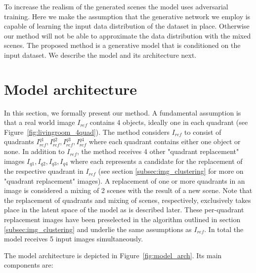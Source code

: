 \documentclass[a4paper,12pt]{report}
\begin{document}
To increase the realism of the generated scenes the model uses adversarial training. Here we make the assumption that the generative network we employ is capable of learning the input data distribution of the dataset in place. Otherwise our method will not be able to approximate the data distribution with the mixed scenes. The proposed method is a generative model that is conditioned on the input dataset. We describe the model and its architecture next.





\section{Model architecture}\label{subsec:model_arch}
In this section, we formally present our method. A fundamental assumption is that a real world image $I_{ref}$ contains 4 objects, ideally one in each quadrant (see Figure~\ref{fig:livingroom_4quad}). The method considers $I_{ref}$ to consist of quadrants $I^{q1}_{ref}, I^{q2}_{ref}, I^{q3}_{ref}, I^{q4}_{ref}$ where each quadrant contains either one object or none. In addition to $I_{ref}$, the method receives 4 other "quadrant replacement" images $I_{q1},I_{q2},I_{q3},I_{q4}$ where each represents a candidate for the replacement of the respective quadrant in $I_{ref}$ (see section \ref{subsec:img_clustering} for more on "quadrant replacement" images). A replacement of one or more quadrants in an image is considered a mixing of 2 scenes with the result of a new scene. Note that the replacement of quadrants and mixing of scenes, respectively, exclusively takes place in the latent space of the model as is described later. These per-quadrant replacement images have been preselected in the algorithm outlined in section \ref{subsec:img_clustering} and underlie the same assumptions as $I_{ref}$. In total the model receives 5 input images simultaneously.

The model architecture is depicted in Figure~\ref{fig:model_arch}. Its main components are:
\end{document}
